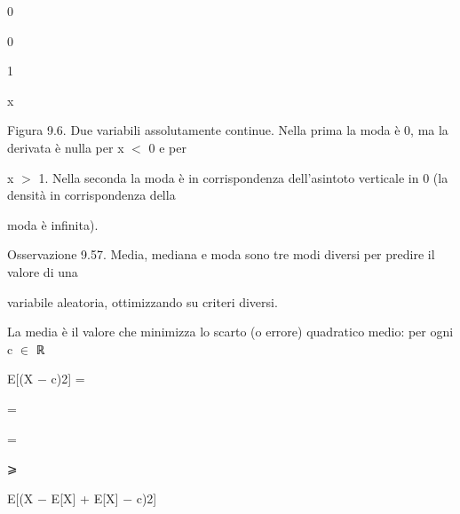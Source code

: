 \documentclass[a4paper,portrait,12pt]{article}
\begin{document}
0





0





1





\begin{flushleft}
x
\end{flushleft}





\begin{flushleft}
Figura 9.6. Due variabili assolutamente continue. Nella prima la moda \`{e} 0, ma la derivata \`{e} nulla per x $<$ 0 e per
\end{flushleft}


\begin{flushleft}
x $>$ 1. Nella seconda la moda \`{e} in corrispondenza dell'asintoto verticale in 0 (la densit\`{a} in corrispondenza della
\end{flushleft}


\begin{flushleft}
moda \`{e} infinita).
\end{flushleft}





\begin{flushleft}
Osservazione 9.57. Media, mediana e moda sono tre modi diversi per predire il valore di una
\end{flushleft}


\begin{flushleft}
variabile aleatoria, ottimizzando su criteri diversi.
\end{flushleft}


\begin{flushleft}
La media \`{e} il valore che minimizza lo scarto (o errore) quadratico medio: per ogni c $\in$ ℝ
\end{flushleft}


\begin{flushleft}
E[(X $-$ c)2] =
\end{flushleft}


=


=


⩾





\begin{flushleft}
E[(X $-$ E[X] + E[X] $-$ c)2]
\end{flushleft}
\end{document}

